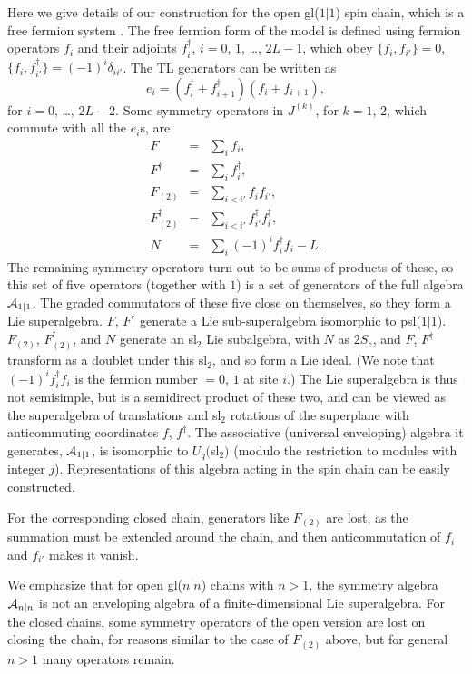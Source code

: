 \documentclass[twocolumn,floats,pra]{revtex4}
\def \cA {{\cal A}}
\newcommand {\be}{\begin{equation}}
\newcommand {\ee} {\end{equation}}
\newcommand {\bea}{\begin{eqnarray}}
\newcommand {\eea} {\end{eqnarray}}
\begin{document}
Here we give details of our construction for the open gl($1|1$)
spin chain, which is a free fermion system \cite{rs}. The free
fermion form of the model is defined using fermion operators $f_i$
and their adjoints $f_i^\dagger$, $i=0$, $1$, \ldots, $2L-1$,
which obey $\{f_i,f_{i'}\}=0$,
$\{f_i,f_{i'}^\dagger\}=(-1)^i\delta_{ii'}$. The TL generators can
be written as%
\be%
e_i=(f_i^\dagger+f_{i+1}^\dagger)(f_i+f_{i+1}),\ee%
for $i=0$, \ldots, $2L-2$. Some symmetry operators in $J^{(k)}$,
for $k=1$, $2$, which commute with all the $e_i$s, are%
\bea%
F&=&\sum_if_i,\\
F^\dagger&=&\sum_if_i^\dagger,\\
F_{(2)}&=&\sum_{i<i'}f_if_{i'},\\
F_{(2)}^\dagger&=&\sum_{i<i'}f_{i'}^\dagger f_{i}^\dagger,\\
N&=&\sum_i(-1)^if_i^\dagger f_i -L.\eea %
The remaining symmetry operators turn out to be sums of products
of these, so this set of five operators (together with $1$) is a
set of generators of the full algebra $\cA_{1|1}$. The graded
commutators of these five close on themselves, so they form a Lie
superalgebra. $F$, $F^\dagger$ generate a Lie sub-superalgebra
isomorphic to psl($1|1$). $F_{(2)}$, $F_{(2)}^\dagger$, and $N$
generate an sl$_2$ Lie subalgebra, with $N$ as $2S_z$, and $F$,
$F^\dagger$ transform as a doublet under this sl$_2$, and so form
a Lie ideal. (We note that $(-1)^if_i^\dagger f_i$ is the fermion
number $=0$, $1$ at site $i$.) The Lie superalgebra is thus not
semisimple, but is a semidirect product of these two, and can be
viewed as the superalgebra of translations and sl$_2$ rotations of
the superplane with anticommuting coordinates $f$, $f^\dagger$.
The associative (universal enveloping) algebra it generates,
$\cA_{1|1}$, is isomorphic to $U_q($sl$_2)$ (modulo the
restriction to modules with integer $j$). Representations of this
algebra acting in the spin chain can be easily constructed.

For the corresponding closed chain, generators like $F_{(2)}$ are
lost, as the summation must be extended around the chain, and then
anticommutation of $f_i$ and $f_{i'}$ makes it vanish.

We emphasize that for open gl($n|n$) chains with $n>1$, the
symmetry algebra $\cA_{n|n}$ is not an enveloping algebra of a
finite-dimensional Lie superalgebra. For the closed chains, some
symmetry operators of the open version are lost on closing the
chain, for reasons similar to the case of $F_{(2)}$ above, but for
general $n>1$ many operators remain.
\end{document}

